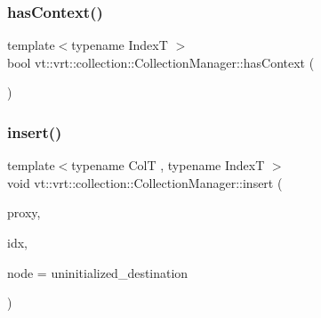 \subsubsection{\texorpdfstring{has\+Context()}{hasContext()}}
{\footnotesize\ttfamily template$<$typename IndexT $>$ \\
bool vt\+::vrt\+::collection\+::\+Collection\+Manager\+::has\+Context (\begin{DoxyParamCaption}{ }\end{DoxyParamCaption})\hspace{0.3cm}{\ttfamily [static]}}

\mbox{\label{structvt_1_1vrt_1_1collection_1_1_collection_manager_af7c0033bd57a7dbb3e70888e7fb2e1a9}} 
\subsubsection{\texorpdfstring{insert()}{insert()}}
{\footnotesize\ttfamily template$<$typename ColT , typename IndexT $>$ \\
void vt\+::vrt\+::collection\+::\+Collection\+Manager\+::insert (\begin{DoxyParamCaption}\item[{\hyperlink{structvt_1_1vrt_1_1collection_1_1_collection_manager_a56458ed7f9bb22b631b9b3a745f42f94}{Collection\+Proxy\+Wrap\+Type}$<$ ColT, IndexT $>$ const \&}]{proxy,  }\item[{IndexT}]{idx,  }\item[{\hyperlink{namespacevt_a866da9d0efc19c0a1ce79e9e492f47e2}{Node\+Type} const \&}]{node = {\ttfamily uninitialized\+\_\+destination} }\end{DoxyParamCaption})}

\mbox{\label{structvt_1_1vrt_1_1collection_1_1_collection_manager_afc919bd549505ed40c3e1a41623d569a}} 
